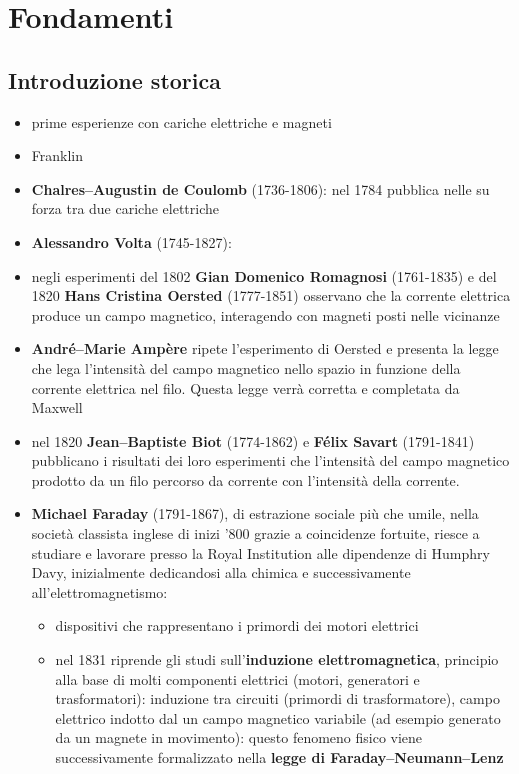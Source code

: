 

\chapter{Fondamenti}

\section{Introduzione storica}
\begin{itemize}
    \item prime esperienze con cariche elettriche e magneti
    \item Franklin
    \item \textbf{Chalres--Augustin de Coulomb} (1736-1806): nel 1784 pubblica nelle su forza tra due cariche elettriche
    \item \textbf{Alessandro Volta} (1745-1827):
    \item negli esperimenti del 1802 \textbf{Gian Domenico Romagnosi} (1761-1835) e del 1820 \textbf{Hans Cristina Oersted} (1777-1851) osservano che la corrente elettrica produce un campo magnetico, interagendo con magneti posti nelle vicinanze
    \item \textbf{André--Marie Ampère} ripete l'esperimento di Oersted e presenta la legge che lega l'intensità del campo magnetico nello spazio in funzione della corrente elettrica nel filo. Questa legge verrà corretta e completata da Maxwell
    \item nel 1820 \textbf{Jean--Baptiste Biot} (1774-1862) e \textbf{Félix Savart} (1791-1841) pubblicano i risultati dei loro esperimenti che l'intensità del campo magnetico prodotto da un filo percorso da corrente con l'intensità della corrente.
    \item \textbf{Michael Faraday} (1791-1867), di estrazione sociale più che umile, nella società classista inglese di inizi '800 grazie a coincidenze fortuite, riesce a studiare e lavorare presso la Royal Institution alle dipendenze di Humphry Davy, inizialmente dedicandosi alla chimica e successivamente all'elettromagnetismo:
        \begin{itemize}
           \item dispositivi che rappresentano i primordi dei motori elettrici
           \item nel 1831 riprende gli studi sull'\textbf{induzione elettromagnetica}, principio alla base di molti componenti elettrici (motori, generatori e trasformatori): induzione tra circuiti (primordi di trasformatore), campo elettrico indotto dal un campo magnetico variabile (ad esempio generato da un magnete in movimento): questo fenomeno fisico viene successivamente formalizzato nella \textbf{legge di Faraday--Neumann--Lenz}

\end{itemize}
\end{itemize}
